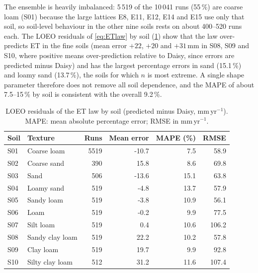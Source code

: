The ensemble is heavily imbalanced: 5\,519 of the 10\,041 runs (55\,\%) are coarse loam (S01) because the large lattices E8, E11, E12, E14 and E15 use only that soil, so soil-level behaviour in the other nine soils rests on about 400--520 runs each. The LOEO residuals of \cref{eq:ETlaw} by soil (\cref{tab:soilres}) show that the law over-predicts ET in the fine soils (mean error $+22$, $+20$ and $+31$\,mm in S08, S09 and S10, where positive means over-prediction relative to Daisy, since errors are predicted minus Daisy) and has the largest percentage errors in sand (15.1\,\%) and loamy sand (13.7\,\%), the soils for which $n$ is most extreme. A single shape parameter therefore does not remove all soil dependence, and the MAPE of about 7.5--15\,\% by soil is consistent with the overall 9.2\,\%.

\begin{table}[H]\centering\small
\caption{LOEO residuals of the ET law by soil (predicted minus Daisy, mm\,yr$^{-1}$). MAPE: mean absolute percentage error; RMSE in mm\,yr$^{-1}$.}
\label{tab:soilres}
\begin{tabular}{llrrrr}
\toprule
Soil & Texture & Runs & Mean error & MAPE (\%) & RMSE\\\midrule
S01 & Coarse loam & 5519 & -10.7 & 7.5 & 58.9\\
S02 & Coarse sand & 390 & 15.8 & 8.6 & 69.8\\
S03 & Sand & 506 & -13.6 & 15.1 & 63.8\\
S04 & Loamy sand & 519 & -4.8 & 13.7 & 57.9\\
S05 & Sandy loam & 519 & -3.8 & 10.9 & 56.1\\
S06 & Loam & 519 & -0.2 & 9.9 & 77.5\\
S07 & Silt loam & 519 & 0.4 & 10.6 & 106.2\\
S08 & Sandy clay loam & 519 & 22.2 & 10.2 & 57.8\\
S09 & Clay loam & 519 & 19.7 & 9.9 & 92.8\\
S10 & Silty clay loam & 512 & 31.2 & 11.6 & 107.4\\
\bottomrule
\end{tabular}
\end{table}

